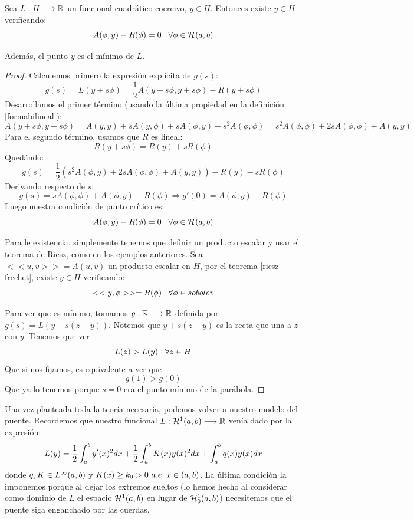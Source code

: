 \begin{prop}
\label{puntocritico}
Sea $L : H \longrightarrow \mathbb{R}$ un funcional cuadrático coercivo, $y\in H$. Entonces existe $y\in H$ verificando:
\[
A(\phi,y)-R(\phi)=0 \;\;\; \forall\phi\in\mathcal{H}^{  } (a,b)
\]

Además, el punto $y$ es el mínimo de $L$.
\end{prop}
\begin{proof}
Calculemos primero la expresión explícita de $g(s)$:
\[
g(s)=L(y+s\phi)=\frac{1}{2}A(y+s\phi,y+s\phi)-R(y+s\phi)
\]
Desarrollamos el primer término (usando la última propiedad en la definición \ref{formabilineal}):
\[
A(y+s\phi,y+s\phi)=A(y,y)+sA(y,\phi)+sA(\phi,y)+s^2A(\phi,\phi)=s^2A(\phi,\phi)+2sA(\phi,\phi)+A(y,y)
\]
Para el segundo término, usamos que $R$ es lineal:
\[
R(y+s\phi)=R(y)+sR(\phi)
\]
Quedándo:
\[
g(s)=\frac{1}{2}\left(s^2A(\phi,y)+2sA(\phi,\phi)+A(y,y)\right)-R(y)-sR(\phi)
\]
Derivando respecto de $s$:
\[
g(s)=sA(\phi,\phi)+A(\phi,y)-R(\phi) \Rightarrow g'(0)=A(\phi,y)-R(\phi)
\]
Luego nuestra condición de punto crítico es:
\[
A(\phi,y)-R(\phi)=0 \;\;\; \forall\phi\in\mathcal{H}^{  } (a,b)
\]

Para le existencia, simplemente tenemos que definir un producto escalar y usar el teorema de Riesz, como en los ejemplos anteriores. Sea $<<u,v>>=A(u,v)$ un producto escalar en $H$, por el teorema \ref{riesz-frechet}, existe $y\in H$ verificando:
\[
<<y,\phi>>=R(\phi) \;\;\; \forall \phi\in\\sobolev{}
\]

Para ver que es mínimo, tomamos $g : \mathbb{R} \longrightarrow \mathbb{R}$ definida por $g(s)=L(y+s(z-y))$. Notemos que $y+s(z-y)$ es la recta que una a $z$ con $y$. Tenemos que ver
\[
L(z)>L(y) \;\;\; \forall z\in H
\]
Que si nos fijamos, es equivalente a ver que
\[
g(1)>g(0)
\]
Que ya lo tenemos porque $s=0$ era el punto mínimo de la parábola.
\end{proof}

Una vez planteada toda la teoría necesaria, podemos volver a nuestro modelo del puente. Recordemos que nuestro funcional  $L : \mathcal{H}^{ 1 } (a,b) \longrightarrow \mathbb{R}$ venía dado por la expresión:
\[
L(y)=\frac{1}{2}\displaystyle\int_{ a }^{ b } y'(x)^2dx+\frac{1}{2}\displaystyle\int_{ a }^{ b } K(x)y(x)^2dx+\displaystyle\int_{ a }^{ b } q(x)y(x)dx
\]
donde $q,K\in L^{ \infty }(a,b)$ y $K(x)\geq k_0 >0\ a.e \;\; x\in(a,b)$. La última condición la imponemos porque al dejar los extremos sueltos (lo hemos hecho al considerar como dominio de $L$ el espacio $\mathcal{H}^{ 1 } (a,b)$ en lugar de $\mathcal{H}_0^{ 1 } (a,b)$) necesitemos que el puente siga enganchado por las cuerdas.

